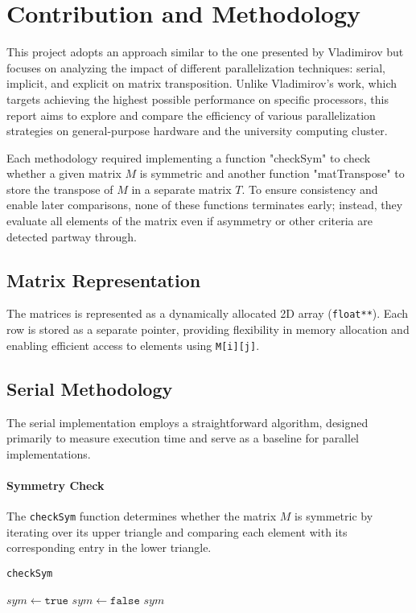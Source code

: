 \documentclass[conference]{IEEEtran}
\begin{document}
\section{Contribution and Methodology}

This project adopts an approach similar to the one presented by Vladimirov but focuses on analyzing the impact of different parallelization techniques: serial, implicit, and explicit on matrix transposition. Unlike Vladimirov’s work, which targets achieving the highest possible performance on specific processors, this report aims to explore and compare the efficiency of various parallelization strategies on general-purpose hardware and the university computing cluster.

Each methodology required implementing a function "checkSym" to check whether a given matrix \( M \) is symmetric and another function "matTranspose" to store the transpose of \( M \) in a separate matrix \( T \). To ensure consistency and enable later comparisons, none of these functions terminates early; instead, they evaluate all elements of the matrix even if asymmetry or other criteria are detected partway through.
\subsection{Matrix Representation}  
The matrices is represented as a dynamically allocated 2D array (\texttt{float**}). Each row is stored as a separate pointer, providing flexibility in memory allocation and enabling efficient access to elements using \texttt{M[i][j]}.

\subsection{Serial Methodology}
The serial implementation employs a straightforward algorithm, designed primarily to measure execution time and serve as a baseline for parallel implementations. 

\paragraph{Symmetry Check}  
The \texttt{checkSym} function determines whether the matrix \( M \) is symmetric by iterating over its upper triangle and comparing each element with its corresponding entry in the lower triangle.
\begin{algorithm}
\caption{\texttt{checkSym}}
\begin{algorithmic}[1]
\State $sym \gets \texttt{true}$
            \State $sym \gets \texttt{false}$
        \EndIf
    \EndFor
\EndFor
\State \Return $sym$
\end{algorithmic}
\end{algorithm}
\end{document}
